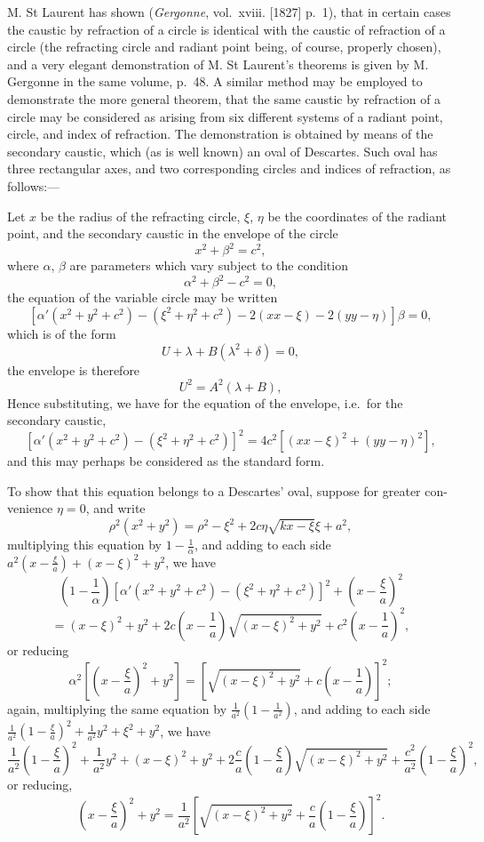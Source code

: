 \documentclass[11pt,a4paper]{book}
\begin{document}
M. St Laurent has shown (\textit{Gergonne}, vol.\ xviii. [1827] p.\ 1), that in certain cases
the caustic by refraction of a circle is identical with the caustic of refraction of a circle
(the refracting circle and radiant point being, of course, properly chosen), and a very
elegant demonstration of M. St Laurent's theorems is given by M. Gergonne in the
same volume, p.\ 48. A similar method may be employed to demonstrate the more
general theorem, that the same caustic by refraction of a circle may be considered as
arising from six different systems of a radiant point, circle, and index of refraction.
The demonstration is obtained by means of the secondary caustic, which (as is well
known) an oval of Descartes. Such oval has three rectangular axes, and two
corresponding circles and indices of refraction, as follows:---

\medskip

Let $x$ be the radius of the refracting circle, $\xi$, $\eta$ be the coordinates of the radiant point,
and the secondary caustic in the envelope of the circle
\[
x^2 + \beta^2 = c^2,
\]
where $\alpha$, $\beta$ are parameters which vary subject to the condition
\[
\alpha^2 + \beta^2 - c^2 = 0,
\]
the equation of the variable circle may be written
\[
[\alpha'(x^2+y^2+c^2)-(\xi^2+\eta^2+c^2)-2(xx-\xi)-2(yy-\eta)]\beta = 0,
\]
which is of the form
\[
U + \lambda + B(\lambda^2 + \delta) = 0,
\]
the envelope is therefore
\[
U^2 = A^2(\lambda + B),
\]
Hence substituting, we have for the equation of the envelope, i.e.\ for the secondary
caustic,
\[
[\alpha'(x^2+y^2+c^2)-(\xi^2+\eta^2+c^2)]^2 = 4c^2[(xx-\xi)^2+(yy-\eta)^2],
\]
and this may perhaps be considered as the standard form.

\medskip

To show that this equation belongs to a Descartes' oval, suppose for greater con-
venience $\eta=0$, and write
\[
\rho^2(x^2+y^2)=\rho^2-\xi^2+2c\eta\sqrt{kx-\xi}\xi+a^2,
\]
multiplying this equation by $1-\tfrac{1}{\alpha}$, and adding to each side $a^2\left(x-\tfrac{\xi}{a}\right)+(x-\xi)^2 + y^2$,
we have
\[
\left(1-\frac{1}{\alpha}\right)[\alpha'(x^2+y^2+c^2)-(\xi^2+\eta^2+c^2)]^2+\left(x-\frac{\xi}{a}\right)^2
\]
\[
=(x-\xi)^2+y^2+2c\left(x-\frac{1}{a}\right)\sqrt{(x-\xi)^2+y^2}+c^2\left(x-\frac{1}{a}\right)^2,
\]
or reducing
\[
\alpha^2\left[\left(x-\frac{\xi}{a}\right)^2+y^2\right]=\left[\sqrt{(x-\xi)^2+y^2}+c\left(x-\frac{1}{a}\right)\right]^2;
\]
again, multiplying the same equation by $\tfrac{1}{a^2}\left(1-\tfrac{1}{a^2}\right)$, and adding to each side
$\tfrac{1}{a^2}\left(1-\tfrac{\xi}{a}\right)^2+\tfrac{1}{a^2}y^2+\xi^2+y^2$,
we have
\[
\frac{1}{a^2}\left(1-\frac{\xi}{a}\right)^2+\frac{1}{a^2}y^2+(x-\xi)^2+y^2+2\frac{c}{a}\left(1-\frac{\xi}{a}\right)\sqrt{(x-\xi)^2+y^2}+\frac{c^2}{a^2}\left(1-\frac{\xi}{a}\right)^2,
\]
or reducing,
\[
\left(x-\frac{\xi}{a}\right)^2+y^2=\frac{1}{a^2}\left[\sqrt{(x-\xi)^2+y^2}+\frac{c}{a}\left(1-\frac{\xi}{a}\right)\right]^2.
\]
\end{document}
